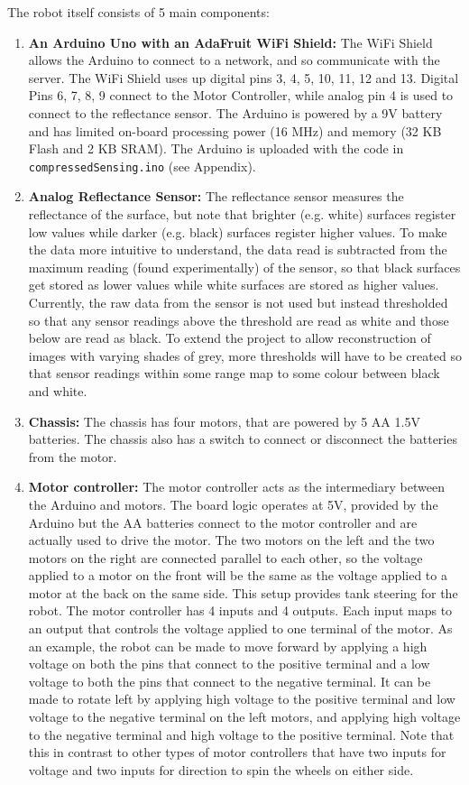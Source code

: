 \documentclass[english]{article}\usepackage[]{graphicx}\usepackage[]{color}
\begin{document}
The robot itself consists of 5 main components:
\begin{enumerate}
\item \textbf{An Arduino Uno with an AdaFruit WiFi Shield:}
		The WiFi Shield allows the Arduino to connect to a network, and so communicate with the server. The WiFi Shield uses up digital pins 3, 4, 5, 10, 11, 12 and 13. Digital Pins 6, 7, 8, 9 connect to the Motor Controller, while analog pin 4 is used to connect to the reflectance sensor. The Arduino is powered by a 9V battery and has limited on-board processing power (16 MHz) and memory (32 KB Flash and 2 KB SRAM). The Arduino is uploaded with the code in \texttt{compressedSensing.ino} (see Appendix).
\item \textbf{Analog Reflectance Sensor:} The reflectance sensor measures the reflectance of the surface, but note that brighter (e.g. white) surfaces register low values while darker (e.g. black)  surfaces register higher values. To make the data more intuitive to understand, the data read is subtracted from the maximum reading (found experimentally) of the sensor, so that black surfaces get stored as lower values while white surfaces are stored as higher values. Currently, the raw data from the sensor is not used but instead thresholded so that any sensor readings above the threshold are read as white and those below are read as black. To extend the project to allow reconstruction of images with varying shades of grey, more thresholds will have to be created so that sensor readings within some range map to some colour between black and white.
\item \textbf{Chassis:} The chassis has four motors, that are powered by 5 AA 1.5V batteries. The chassis also has a switch to connect or disconnect the batteries from the motor.
\item \textbf{Motor controller:} The motor controller acts as the intermediary between the Arduino and motors. The board logic operates at 5V, provided by the Arduino but the AA batteries connect to the motor controller and are actually used to drive the motor. The two motors on the left and the two motors on the right are connected parallel to each other, so the voltage applied to a motor on the front will be the same as the voltage applied to a motor at the back on the same side. This setup provides tank steering for the robot. The motor controller has 4 inputs and 4 outputs. Each input maps to an output that controls the voltage applied to one terminal of the motor. As an example, the robot can be made to move forward by applying a high voltage on both the pins that connect to the positive terminal and a low voltage to both the pins that connect to the negative terminal. It can be made to rotate left by applying high voltage to the positive terminal and low voltage to the negative terminal on the left motors, and applying high voltage to the negative terminal and high voltage to the positive terminal. Note that this in contrast to other types of motor controllers that have two inputs for voltage and two inputs for direction to spin the wheels on either side.


\end{enumerate}
\end{document}
